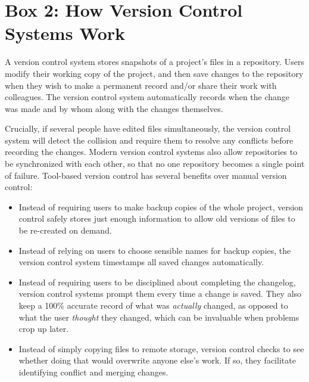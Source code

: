 \documentclass[10pt,letterpaper]{article}
\begin{document}
\pagebreak

\section*{Box 2: How Version Control Systems Work}

A version control system stores snapshots of a project's files in a
repository. Users modify their working copy of the project, and then
save changes to the repository when they wish to make
a permanent record and/or share their work with colleagues. The
version control system automatically records when the change was
made and by whom along with the changes themselves.

Crucially, if several people have edited files simultaneously, the
version control system will detect the collision and require them to
resolve any conflicts before recording the changes. Modern version
control systems also allow repositories to be synchronized with each
other, so that no one repository becomes a single point of failure.
Tool-based version control has several benefits over manual version
control:

\begin{itemize}

\item
  Instead of requiring users to make backup copies of the whole project,
  version control safely stores just enough information to allow old
  versions of files to be re-created on demand.

\item
  Instead of relying on users to choose sensible names for backup
  copies, the version control system timestamps all saved changes
  automatically.

\item
  Instead of requiring users to be disciplined about completing the
  changelog, version control systems prompt them every time a change
  is saved. They also keep a 100\% accurate record of what was
  \emph{actually} changed, as opposed to what the user
  \emph{thought} they changed, which can be invaluable when problems
  crop up later.

\item
  Instead of simply copying files to remote storage, version control
  checks to see whether doing that would overwrite anyone else's
  work. If so, they facilitate identifying conflict and merging changes.

\end{itemize}
\end{document}
